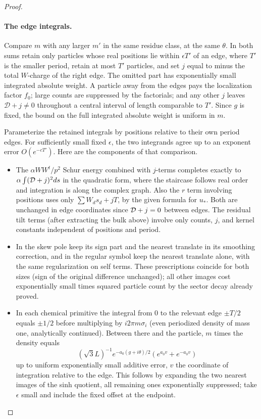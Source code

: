 \begin{proof}
\paragraph{The edge integrals.}
Compare $m$ with any larger $m'$ in the same residue class, at the same $\theta$. In both sums retain only particles whose real positions lie within $\epsilon T'$ of an edge, where $T'$ is the smaller period, retain at most $T'$ particles, and set $j$ equal to minus the total $W$-charge of the right edge. The omitted part has exponentially small integrated absolute weight. A particle away from the edges pays the localization factor $f_0$; large counts are suppressed by the factorials; and any other $j$ leaves $\mathcal D+j\ne0$ throughout a central interval of length comparable to $T'$. Since $g$ is fixed, the bound on the full integrated absolute weight is uniform in $m$.

Parameterize the retained integrals by positions relative to their own period edges. For sufficiently small fixed $\epsilon$, the two integrands agree up to an exponent error $O(e^{-cT'})$. Here are the components of that comparison.

\begin{itemize}

\item 

The \(\alpha WW^t/p^2\) Schur energy combined with \(j\)-terms completes exactly to \(\alpha\int({\cal D}+j)^2 ds\) in the quadratic form, where the staircase follows real order and integration is along the complex graph. Also the \(r\) term involving positions uses only \(\sum W_d s_d+jT\), by the given formula for \(u_*\). Both are unchanged in edge coordinates since \({\cal D}+j=0\) between edges. The residual tilt terms (after extracting the bulk above) involve only counts, \(j\), and kernel constants independent of positions and period.

\item 

In the skew pole keep its sign part and the nearest translate in its smoothing correction, and in the regular symbol keep the nearest translate alone, with the same regularization on self terms. These prescriptions coincide for both sizes (sign of the original difference unchanged); all other images cost exponentially small times squared particle count by the sector decay already proved.

\item 

In each chemical primitive the integral from 0 to the relevant edge \(\pm T/2\) equals \(\pm1/2\) before multiplying by \(i2\pi m\sigma_i\) (even periodized density of mass one, analytically continued). Between there and the particle, \(m\) times the density equals
\[
 (\sqrt3 L)^{-1} e^{-a_0(g+i\theta)/2}
 \left(e^{a_0 v}+e^{-a_0 v}\right)
\]
up to uniform exponentially small additive error, \(v\) the coordinate of integration relative to the edge. This follows by expanding the two nearest images of the sinh quotient, all remaining ones exponentially suppressed; take \(\epsilon\) small and include the fixed offset at the endpoint.


\end{itemize}
\end{proof}
